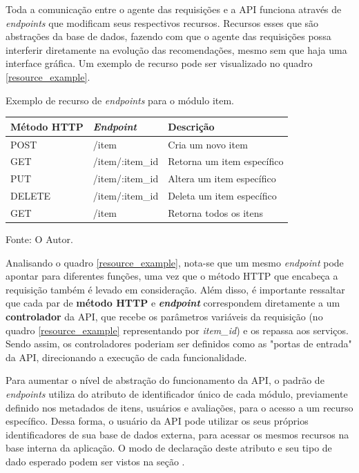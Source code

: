 \documentclass[12pt, openright, oneside, a4paper, brazil]{abntex2}
\begin{document}
Toda a comunicação entre o agente das requisições e a API funciona através de \textit{endpoints} que modificam seus respectivos recursos. Recursos esses que são abstrações da base de dados, fazendo com que o agente das requisições possa interferir diretamente na evolução das recomendações, mesmo sem que haja uma interface gráfica. Um exemplo de recurso pode ser visualizado no quadro \ref{resource_example}.

\begin{quadro}[h!tp]

	\caption{\label{resource_example}Exemplo de recurso de \textit{endpoints} para o módulo item.}
	\centering
	\begin{tabular}{|l|l|l|}
	\hline
	\textbf{Método HTTP} & \textit{\textbf{Endpoint}} & \textbf{Descrição}          \\ \hline
	POST                 & /item                      & Cria um novo item           \\ \hline
	GET                  & /item/:item\_id 			  & Retorna um item específico  \\ \hline
	PUT                  & /item/:item\_id            & Altera um item específico   \\ \hline
	DELETE               & /item/:item\_id            & Deleta um item específico   \\ \hline
	GET                  & /item                      & Retorna todos os itens      \\ \hline
	\end{tabular}

	Fonte: O Autor.

\end{quadro}

Analisando o quadro \ref{resource_example}, nota-se que um mesmo \textit{endpoint} pode apontar para diferentes funções, uma vez que o método HTTP que encabeça a requisição também é levado em consideração. Além disso, é importante ressaltar que cada par de \textbf{método HTTP} e \textbf{\textit{endpoint}} correspondem diretamente a um \textbf{controlador} da API, que recebe os parâmetros variáveis da requisição (no quadro \ref{resource_example} representando por \textit{item\_id}) e os repassa aos serviços. Sendo assim, os controladores poderiam ser definidos como as "portas de entrada" da API, direcionando a execução de cada funcionalidade.

Para aumentar o nível de abstração do funcionamento da API, o padrão de \textit{endpoints} utiliza do atributo de identificador único de cada módulo, previamente definido nos metadados de itens, usuários e avaliações, para o acesso a um recurso específico. Dessa forma, o usuário da API pode utilizar os seus próprios identificadores de sua base de dados externa, para acessar os mesmos recursos na base interna da aplicação. O modo de declaração deste atributo e seu tipo de dado esperado podem ser vistos na seção . 
\end{document}

